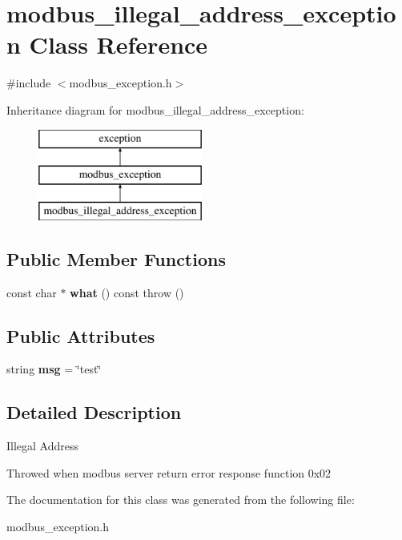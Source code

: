 \hypertarget{classmodbus__illegal__address__exception}{}\section{modbus\+\_\+illegal\+\_\+address\+\_\+exception Class Reference}
\label{classmodbus__illegal__address__exception}


{\ttfamily \#include $<$modbus\+\_\+exception.\+h$>$}

Inheritance diagram for modbus\+\_\+illegal\+\_\+address\+\_\+exception\+:\begin{figure}[H]
\begin{center}
\leavevmode
\includegraphics[height=3.000000cm]{classmodbus__illegal__address__exception}
\end{center}
\end{figure}
\subsection*{Public Member Functions}
\begin{DoxyCompactItemize}
\item 
\mbox{\label{classmodbus__illegal__address__exception_a231a6fe435cc67cc9b8c65480167cd94}} 
const char $\ast$ {\bfseries what} () const  throw ()
\end{DoxyCompactItemize}
\subsection*{Public Attributes}
\begin{DoxyCompactItemize}
\item 
\mbox{\label{classmodbus__illegal__address__exception_a9b3faa192aafda705fa518851a845c09}} 
string {\bfseries msg} = \char`\"{}test\char`\"{}
\end{DoxyCompactItemize}


\subsection{Detailed Description}
Illegal Address

Throwed when modbus server return error response function 0x02 

The documentation for this class was generated from the following file\+:\begin{DoxyCompactItemize}
\item 
modbus\+\_\+exception.\+h\end{DoxyCompactItemize}
